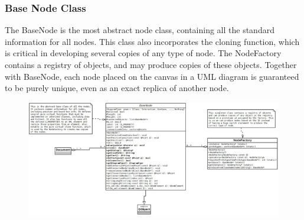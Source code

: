 \documentclass[twoside,letterpaper]{article}
\begin{document}
{\subsubsection[\ Base Node Class ]
{\bfseries Base Node Class }
{
The BaseNode is the most abstract node class, containing all the standard information for all nodes. This class also incorporates the cloning function, which is critical in developing several copies of any type of node. \newline
The NodeFactory contains a registry of objects, and may produce copies of these objects. Together with BaseNode, each node placed on the canvas in a UML diagram is guaranteed to be purely unique, even as an exact replica of another node. 
}
  \begin{figure}[h]
  \centering
  \includegraphics[width=6.5in]{class_basenode.jpeg}
  \end{figure}

\clearpage
}
\end{document}
